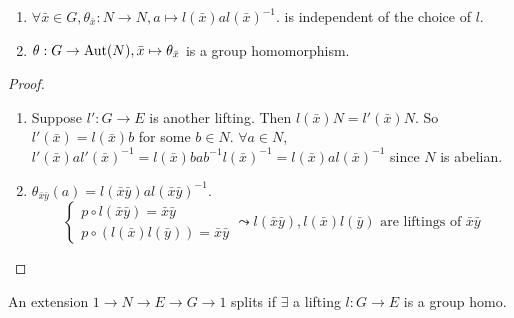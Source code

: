 \begin{prop} \mbox{}
  \begin{enumerate}
    \item $\forall \bar{x}\in G, \theta_{\bar{x}}: N \to N, a \mapsto l(\bar{x})al(\bar{x})^{-1}$.
      is independent of the choice of $l$.
    \item $\theta: G \to \operatorname{Aut}(N), \bar{x} \mapsto \theta_{\bar{x}}$ is a group homomorphism.
  \end{enumerate}
  \begin{proof} \mbox{}
    \begin{enumerate}
      \item Suppose $l': G \to E$ is another lifting. Then $l(\bar{x})N = l'(\bar{x})N$.
        So $l'(\bar{x}) = l(\bar{x})b$ for some $b \in N$.
        $\forall a \in N$, $l'(\bar{x})al'(\bar{x})^{-1} = l(\bar{x})bab^{-1}l(\bar{x})^{-1}
        = l(\bar{x})al(\bar{x})^{-1}$ since $N$ is abelian.
      \item $\theta_{\bar{x}\bar{y}}(a) = l(\bar{x}\bar{y})al(\bar{x}\bar{y})^{-1}$.
        \[
          \begin{cases}
            p \circ l(\bar{x}\bar{y}) = \bar{x}\bar{y} \\
            p \circ (l(\bar{x})l(\bar{y})) = \bar{x}\bar{y}
          \end{cases}
          \leadsto l(\bar{x}\bar{y}), l(\bar{x})l(\bar{y})
          \text{~are liftings of~} \bar{x}\bar{y}
        \]
    \end{enumerate}
  \end{proof}
\end{prop}

\begin{definition}
  An extension $1\to N\to E\to G\to 1$ splits if $\exists$ a lifting
  $l: G\to E$ is a group homo.
\end{definition}

